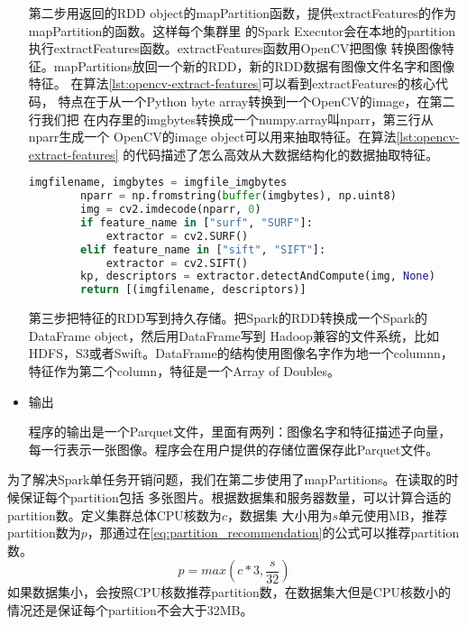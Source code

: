\begin{itemize}
        第二步用返回的RDD object的mapPartition函数，提供extractFeatures的作为mapPartition的函数。这样每个集群里
        的Spark Executor会在本地的partition执行extractFeatures函数。extractFeatures函数用OpenCV把图像
        转换图像特征。mapPartitions放回一个新的RDD，新的RDD数据有图像文件名字和图像特征。
        在算法\ref{lst:opencv-extract-features}可以看到extractFeatures的核心代码，
        特点在于从一个Python byte array转换到一个OpenCV的image，在第二行我们把
        在内存里的imgbytes转换成一个numpy.array叫nparr，第三行从nparr生成一个
        OpenCV的image object可以用来抽取特征。在算法\ref{lst:opencv-extract-features}
        的代码描述了怎么高效从大数据结构化的数据抽取特征。
        \begin{minipage}{\linewidth}
        \begin{lstlisting}[language=Python,
                           basicstyle=\small,
                           showstringspaces=false,
                           caption={OpenCV从内存读取图像抽取特征},
                           label={lst:opencv-extract-features}]
        imgfilename, imgbytes = imgfile_imgbytes
        nparr = np.fromstring(buffer(imgbytes), np.uint8)
        img = cv2.imdecode(nparr, 0)
        if feature_name in ["surf", "SURF"]:
            extractor = cv2.SURF()
        elif feature_name in ["sift", "SIFT"]:
            extractor = cv2.SIFT()
        kp, descriptors = extractor.detectAndCompute(img, None)
        return [(imgfilename, descriptors)]
        \end{lstlisting}
        \end{minipage}

        第三步把特征的RDD写到持久存储。把Spark的RDD转换成一个Spark的DataFrame object，然后用DataFrame写到
        Hadoop兼容的文件系统，比如HDFS，S3或者Swift。DataFrame的结构使用图像名字作为地一个columnn，
        特征作为第二个column，特征是一个Array of Doubles。


  \item 输出

        程序的输出是一个Parquet文件，里面有两列：图像名字和特征描述子向量，
        每一行表示一张图像。程序会在用户提供的存储位置保存此Parquet文件。

\end{itemize}

为了解决Spark单任务开销问题，我们在第二步使用了mapPartitions。在读取的时候保证每个partition包括
多张图片。根据数据集和服务器数量，可以计算合适的partition数。定义集群总体CPU核数为$c$，数据集
大小用为$s$单元使用MB，推荐partition数为$p$，那通过在\ref{eq:partition_recommendation}的公式可以推荐partition数。
\begin{equation} \label{eq:partition_recommendation}
p = max(c * 3, \frac{s}{32})
\end{equation}
如果数据集小，会按照CPU核数推荐partition数，在数据集大但是CPU核数小的情况还是保证每个partition不会大于32MB。



